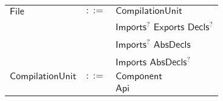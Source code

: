 







\begin{longtable}[l]{p{3cm}ll}
$\mathsf{File}$ &  $\mathsf{::=}$  & $\mathsf{CompilationUnit}$ \\
 &  &  $\mathsf{Imports}$$^?$ $\mathsf{Exports}$ $\mathsf{Decls}$$^?$ \\
 &  &  $\mathsf{Imports}$$^?$ $\mathsf{AbsDecls}$ \\
 &  &  $\mathsf{Imports}$ $\mathsf{AbsDecls}$$^?$ \\
$\mathsf{CompilationUnit}$ &  $\mathsf{::=}$  & $\mathsf{Component}$ \\
 &  &  $\mathsf{Api}$ \\
\end{longtable} \hfill 



